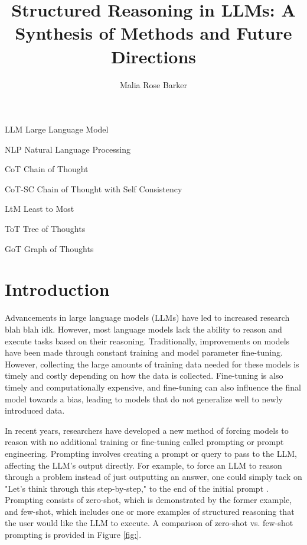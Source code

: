 \documentclass[project]{bsu-cs}  %
\title{Structured Reasoning in LLMs: A Synthesis of Methods and Future Directions}
\author{Malia Rose Barker}
\begin{document}
\frontmatter  %
% 
\buildFrontPages %
% 
\begin{listAbbreviations}
  \item[LLM] Large Language Model
  \item[NLP] Natural Language Processing
  \item[CoT] Chain of Thought
  \item[CoT-SC] Chain of Thought with Self Consistency
  \item[LtM] Least to Most
  \item[ToT] Tree of Thoughts
  \item[GoT] Graph of Thoughts
\end{listAbbreviations}
% 
% 
\mainmatter
% 
%
%
% 
\chapter{Introduction} \label{ch:intro}
Advancements in large language models (LLMs) have led to increased research blah blah idk. However, most language models lack the ability to reason and execute tasks based on their reasoning. Traditionally, improvements on models have been made through constant training and model parameter fine-tuning. However, collecting the large amounts of training data needed for these models is timely and costly depending on how the data is collected. Fine-tuning is also timely and computationally expensive, and fine-tuning can also influence the final model towards a bias, leading to models that do not generalize well to newly introduced data. 

In recent years, researchers have developed a new method of forcing models to reason with no additional training or fine-tuning called prompting or prompt engineering. Prompting involves creating a prompt or query to pass to the LLM, affecting the LLM's output directly. For example, to force an LLM to reason through a problem instead of just outputting an answer, one could simply tack on "Let's think through this step-by-step," to the end of the initial prompt \citep{kojima2023largelanguagemodelszeroshot}. Prompting consists of zero-shot, which is demonstrated by the former example, and few-shot, which includes one or more examples of structured reasoning that the user would like the LLM to execute. A comparison of zero-shot vs. few-shot prompting is provided in Figure \ref{fig:}.
\end{document}
